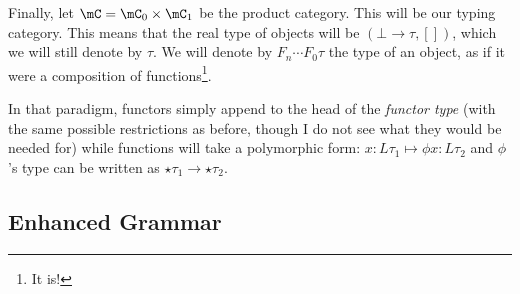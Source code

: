 \documentclass[math, english, info]{cours}
\begin{document}
Finally, let $\mC = \mC_{0} \times \mC_{1}$ be the product category. This will be our typing category.
This means that the real type of objects will be $\left( \bot \to \tau, [] \right)$, which we will still denote by $\tau$.
We will denote by $F_{n} \cdots F_{0} \tau$ the type of an object, as if it were a composition of functions\footnote{It is!}.

In that paradigm, functors simply append to the head of the \emph{functor type} (with the same possible restrictions as before, though I do not see what they would be needed for) while functions will take a polymorphic form:
$x: L\tau_{1} \mapsto \phi x: L\tau_{2}$ and $\phi$'s type can be written as $\star\tau_{1} \to \star\tau_{2}$.

\subsection{Enhanced Grammar}



\end{document}
